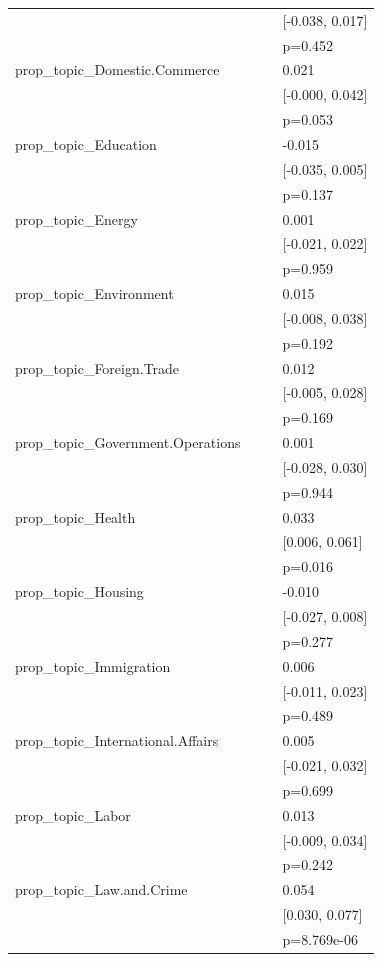 \begin{tabular}{llll}
&  &  & [-0.038, 0.017] \\
&  &  & p=0.452 \\
prop_topic_Domestic.Commerce &  &  & 0.021 \\
&  &  & [-0.000, 0.042] \\
&  &  & p=0.053 \\
prop_topic_Education &  &  & -0.015 \\
&  &  & [-0.035, 0.005] \\
&  &  & p=0.137 \\
prop_topic_Energy &  &  & 0.001 \\
&  &  & [-0.021, 0.022] \\
&  &  & p=0.959 \\
prop_topic_Environment &  &  & 0.015 \\
&  &  & [-0.008, 0.038] \\
&  &  & p=0.192 \\
prop_topic_Foreign.Trade &  &  & 0.012 \\
&  &  & [-0.005, 0.028] \\
&  &  & p=0.169 \\
prop_topic_Government.Operations &  &  & 0.001 \\
&  &  & [-0.028, 0.030] \\
&  &  & p=0.944 \\
prop_topic_Health &  &  & 0.033 \\
&  &  & [0.006, 0.061] \\
&  &  & p=0.016 \\
prop_topic_Housing &  &  & -0.010 \\
&  &  & [-0.027, 0.008] \\
&  &  & p=0.277 \\
prop_topic_Immigration &  &  & 0.006 \\
&  &  & [-0.011, 0.023] \\
&  &  & p=0.489 \\
prop_topic_International.Affairs &  &  & 0.005 \\
&  &  & [-0.021, 0.032] \\
&  &  & p=0.699 \\
prop_topic_Labor &  &  & 0.013 \\
&  &  & [-0.009, 0.034] \\
&  &  & p=0.242 \\
prop_topic_Law.and.Crime &  &  & 0.054 \\
&  &  & [0.030, 0.077] \\
&  &  & p=8.769e-06 \\

\end{tabular}
